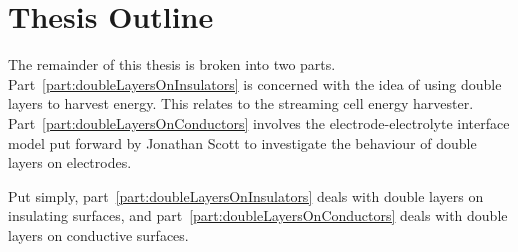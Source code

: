 \section{Thesis Outline}
  
  The remainder of this thesis is broken into two parts.
  Part~\ref{part:doubleLayersOnInsulators} is concerned with the idea of using double layers to harvest energy.
  This relates to the streaming cell energy harvester.
  Part~\ref{part:doubleLayersOnConductors} involves the electrode-electrolyte interface model put forward by Jonathan Scott to investigate the behaviour of double layers on electrodes.

  Put simply, part~\ref{part:doubleLayersOnInsulators} deals with double layers on insulating surfaces, and part~\ref{part:doubleLayersOnConductors} deals with double layers on conductive surfaces.
